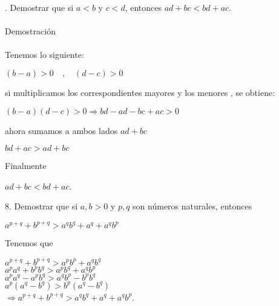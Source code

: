 \documentclass[12pt,a4paper,scrartcl]{article}
\begin{document}
{. Demostrar que si $a<b$ y $c<d$, entonces $ad+bc<bd+ac$.\\
\\Demostraci\'on\\
\\Tenemos lo siguiente:
\begin{center}
$(b-a)>0 \hspace{1em},\hspace{1em} (d-c)>0$ 
\end{center}
si multiplicamos los correspondientes mayores y los menores , se obtiene:
\begin{center}
$(b-a)(d-c)>0 \Rightarrow bd-ad-bc+ac>0$
\end{center}
ahora sumamos a ambos lados $ad+bc$\\
\begin{center}
$bd+ac>ad+bc$\\
\end{center}
Finalmente
\begin{center}
$ad+bc<bd+ac$.
\end{center}

\vspace{3em}
8. Demostrar que si $a,b>0$ y $p,q$ son n\'umeros naturales, entonces\\
\begin{center}
$a^{p+q}+b^{p+q}>a^qb^q+a^q+a^qb^p$
\end{center}
Tenemos que\\
\begin{center}
$a^{p+q}+b^{p+q}>a^pb^p+a^qb^q$\\
$a^pa^q+b^pb^q>a^pb^q+a^qb^p$\\
$a^pa^q-a^pb^q>a^qb^p-b^pb^q$\\
$a^p(a^q-b^q)>b^p(a^q-b^q)$\\\vspace{1em}
$\Rightarrow a^{p+q}+b^{p+q}>a^qb^q+a^q+a^qb^p$.
\end{center}




}
\end{document}

